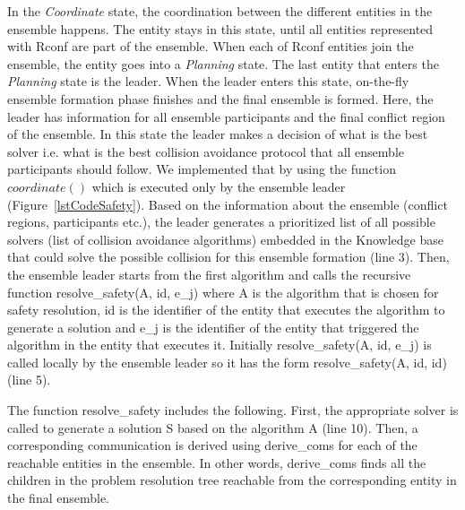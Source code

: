 \documentclass[journal]{IEEEtran}
\theoremstyle{definition}
\newcommand{\ugh}[1]{\textcolor{red}{\uwave{#1}}} %
\newcommand\patrizio[1]{\nb{Patrizio}{#1}}
\newcommand\todo[1]{\nb{Todo}{#1}}
\begin{document}
In the \textit{Coordinate} state, 
the coordination between the different entities in the ensemble happens.  The entity stays in this state, until all entities represented with Rconf are part of the ensemble. 
When each of Rconf entities join the ensemble, the entity
goes into a \textit{Planning} state. The last entity that enters the \textit{Planning} state is the leader. When the leader enters this state,  on-the-fly ensemble formation phase finishes and the final ensemble is formed. 
Here, the leader has information for all ensemble participants and the final conflict region of the ensemble.
In this state the leader makes a decision of what is the best solver i.e.  what is the best collision avoidance protocol that all ensemble participants should follow. We implemented that by using the function $coordinate()$  %
which is executed only by the ensemble leader (Figure~\ref{lstCodeSafety}). 
Based on the information about the ensemble (conflict regions, participants etc.), the leader generates a prioritized list of all possible solvers (list of collision avoidance algorithms) embedded in the Knowledge base that could solve the possible collision for this ensemble formation (line 3). 
Then, the ensemble leader starts from the first algorithm and calls the recursive function resolve\_safety(A, id, e\_j) where A is the algorithm that is chosen for safety resolution, id is the identifier of the entity that executes the algorithm to generate a solution and e\_j is the identifier of the entity that triggered the algorithm in the entity that executes it. 
Initially resolve\_safety(A, id, e\_j) is called locally by the ensemble leader so it has the form resolve\_safety(A, id, id) (line 5).

The function resolve\_safety includes the following.
First, the appropriate solver is called to generate a solution S based on the algorithm A (line 10). 
Then, a corresponding communication is derived using derive\_coms for each of the reachable entities in the ensemble. In other words, derive\_coms finds all the children in the problem resolution tree reachable from the corresponding entity in the final ensemble.
\end{document}
